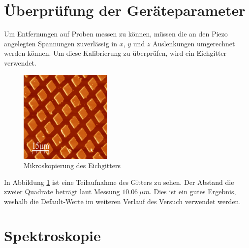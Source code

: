     \section{Überprüfung der Geräteparameter}

Um Entfernungen auf Proben messen zu können, müssen die an den Piezo angelegten 
Spannungen zuverlässig in $x$, $y$ und $z$ Auslenkungen umgerechnet werden können.
Um diese Kalibrierung zu überprüfen, wird ein Eichgitter verwendet.
\begin{figure}[hb]
    \centering
    \includegraphics[width=0.4\textwidth]{Mess/gitter_aso.pdf}
    \caption{Mikroskopierung des Eichgitters}
    \label{gitter}
\end{figure}
In Abbildung \ref{gitter} ist eine Teilaufnahme des Gitters zu sehen. Der Abstand die 
zweier Quadrate beträgt laut Messung $\SI{10,06}{\mu m}$. Dies ist ein gutes 
Ergebnis, weshalb die Default-Werte im weiteren Verlauf des Versuch verwendet 
werden.

    \section{Spektroskopie}

